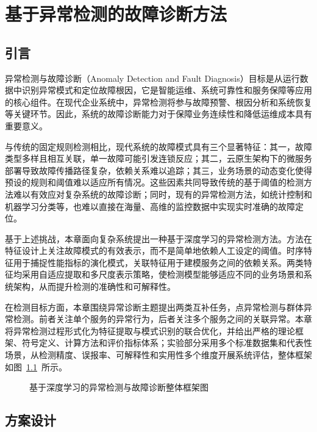 
\chapter{基于异常检测的故障诊断方法}\label{ch:system-management}

\section{引言}\label{ux5f15ux8a00-1}

异常检测与故障诊断（Anomaly Detection and Fault Diagnosis）目标是从运行数据中识别异常模式和定位故障根因，它是智能运维、系统可靠性和服务保障等应用的核心组件。在现代企业系统中，异常检测将参与故障预警、根因分析和系统恢复等关键环节。因此，系统的故障诊断能力对于保障业务连续性和降低运维成本具有重要意义。

与传统的固定规则检测相比，现代系统的故障模式具有三个显著特征：其一，故障类型多样且相互关联，单一故障可能引发连锁反应；其二，云原生架构下的微服务部署导致故障传播路径复杂，依赖关系难以追踪；其三，业务场景的动态变化使得预设的规则和阈值难以适应所有情况。这些因素共同导致传统的基于阈值的检测方法难以有效应对复杂系统的故障诊断；同时，现有的异常检测方法，如统计控制和机器学习分类等，也难以直接在海量、高维的监控数据中实现实时准确的故障定位。

基于上述挑战，本章面向复杂系统提出一种基于深度学习的异常检测方法。方法在特征设计上关注故障模式的有效表示，而不是简单地依赖人工设定的阈值。时序特征用于捕捉性能指标的演化模式，关联特征用于建模服务之间的依赖关系。两类特征均采用自适应提取和多尺度表示策略，使检测模型能够适应不同的业务场景和系统架构，从而提升检测的准确性和可解释性。

在检测目标方面，本章围绕异常诊断主题提出两类互补任务，点异常检测与群体异常检测。前者关注单个服务的异常行为，后者关注多个服务之间的关联异常。本章将异常检测过程形式化为特征提取与模式识别的联合优化，并给出严格的理论框架、符号定义、计算方法和评价指标体系；实验部分采用多个标准数据集和代表性场景，从检测精度、误报率、可解释性和实用性多个维度开展系统评估，整体框架如图~\ref{fig:ch4-system-monitoring-framework}~所示。

\begin{figure}[htbp]
\centering
{}
\caption{基于深度学习的异常检测与故障诊断整体框架图}
\label{fig:ch4-system-monitoring-framework}
\end{figure}

\section{方案设计}\label{ux65b9ux6848ux8bbeux8ba1-1}


